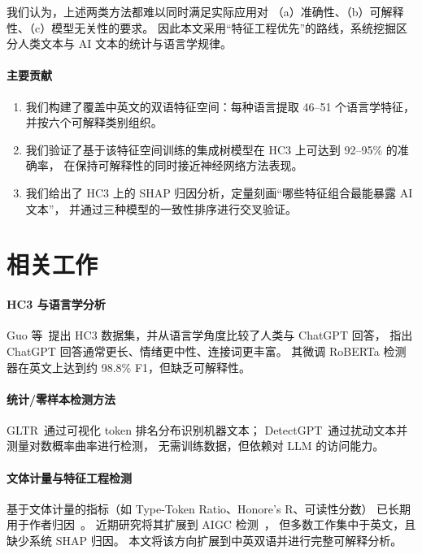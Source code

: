 \documentclass[sigconf]{acmart}
\begin{document}
我们认为，上述两类方法都难以同时满足实际应用对
（a）准确性、（b）可解释性、（c）模型无关性的要求。
因此本文采用“特征工程优先”的路线，系统挖掘区分人类文本与 AI 文本的统计与语言学规律。

\paragraph{主要贡献}
\begin{enumerate}
\item 我们构建了覆盖中英文的双语特征空间：每种语言提取 46--51 个语言学特征，
      并按六个可解释类别组织。
\item 我们验证了基于该特征空间训练的集成树模型在 HC3 上可达到 92--95\% 的准确率，
      在保持可解释性的同时接近神经网络方法表现。
\item 我们给出了 HC3 上的 SHAP 归因分析，定量刻画“哪些特征组合最能暴露 AI 文本”，
      并通过三种模型的一致性排序进行交叉验证。
\end{enumerate}

\section{相关工作}

\paragraph{HC3 与语言学分析}
Guo 等~\cite{guo2023hc3}提出 HC3 数据集，并从语言学角度比较了人类与 ChatGPT 回答，
指出 ChatGPT 回答通常更长、情绪更中性、连接词更丰富。
其微调 RoBERTa 检测器在英文上达到约 98.8\% F1，但缺乏可解释性。

\paragraph{统计/零样本检测方法}
GLTR~\cite{gehrmann2019gltr}通过可视化 token 排名分布识别机器文本；
DetectGPT~\cite{mitchell2023detectgpt}通过扰动文本并测量对数概率曲率进行检测，
无需训练数据，但依赖对 LLM 的访问能力。

\paragraph{文体计量与特征工程检测}
基于文体计量的指标（如 Type-Token Ratio、Honore's R、可读性分数）
已长期用于作者归因~\cite{juola2006}。
近期研究将其扩展到 AIGC 检测~\cite{bhatt2023stylometric}，
但多数工作集中于英文，且缺少系统 SHAP 归因。
本文将该方向扩展到中英双语并进行完整可解释分析。
\end{document}
